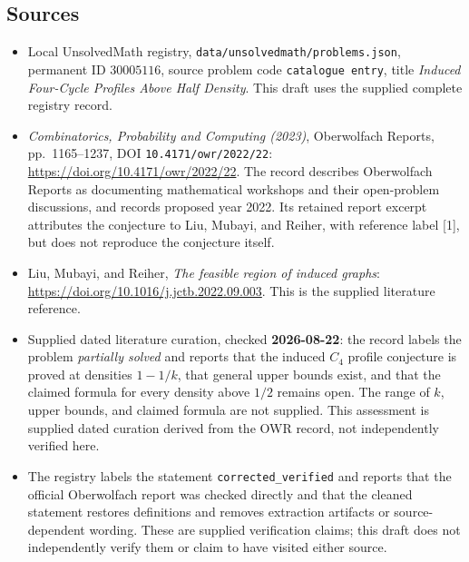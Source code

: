 \documentclass[11pt]{article}
\begin{document}
\subsection{Sources}
\begin{itemize}
\item Local UnsolvedMath registry, \texttt{data/unsolvedmath/problems.json}, permanent ID \(30005116\), source problem code \texttt{catalogue entry}, title \emph{Induced Four-Cycle Profiles Above Half Density}. This draft uses the supplied complete registry record.
\item \emph{Combinatorics, Probability and Computing (2023)}, Oberwolfach Reports, pp.~1165--1237, DOI \texttt{10.4171/owr/2022/22}: \url{https://doi.org/10.4171/owr/2022/22}. The record describes Oberwolfach Reports as documenting mathematical workshops and their open-problem discussions, and records proposed year 2022. Its retained report excerpt attributes the conjecture to Liu, Mubayi, and Reiher, with reference label [1], but does not reproduce the conjecture itself.
\item Liu, Mubayi, and Reiher, \emph{The feasible region of induced graphs}: \url{https://doi.org/10.1016/j.jctb.2022.09.003}. This is the supplied literature reference.
\item Supplied dated literature curation, checked \textbf{2026-08-22}: the record labels the problem \emph{partially solved} and reports that the induced \(C_4\) profile conjecture is proved at densities \(1-1/k\), that general upper bounds exist, and that the claimed formula for every density above \(1/2\) remains open. The range of \(k\), upper bounds, and claimed formula are not supplied. This assessment is supplied dated curation derived from the OWR record, not independently verified here.
\item The registry labels the statement \texttt{corrected\_verified} and reports that the official Oberwolfach report was checked directly and that the cleaned statement restores definitions and removes extraction artifacts or source-dependent wording. These are supplied verification claims; this draft does not independently verify them or claim to have visited either source.
\end{itemize}
\end{document}
